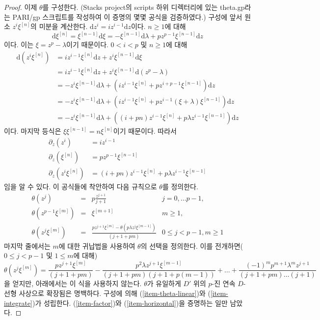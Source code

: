 \begin{proof}
\medskip\noindent
이제 $\theta$를 구성한다. (Stacks project의 scripts 하위 디렉터리에
있는 theta.gp라는 PARI/gp 스크립트를 작성하여 이 증명의 몇몇 공식을
검증하였다.) 구성에 앞서 원소 $z^i \xi^{[n]}$의 미분을 계산한다.
$\text{d}z^i = i z^{i - 1} \text{d}z$이다. $n \geq 1$에 대해
$$
\text{d}\xi^{[n]} =
\xi^{[n - 1]} \text{d}\xi =
- \xi^{[n - 1]}\text{d}\lambda + p z^{p - 1} \xi^{[n - 1]}\text{d}z
$$
이다. 이는 $\xi = z^p - \lambda$이기 때문이다. $0 < i < p$ 및
$n \geq 1$에 대해
\begin{align*}
\text{d}(z^i\xi^{[n]})
& =
iz^{i - 1}\xi^{[n]}\text{d}z + z^i\xi^{[n - 1]}\text{d}\xi \\
& =
iz^{i - 1}\xi^{[n]}\text{d}z + z^i\xi^{[n - 1]}\text{d}(z^p - \lambda) \\
& =
- z^i\xi^{[n - 1]}\text{d}\lambda +
(iz^{i - 1}\xi^{[n]} + pz^{i + p - 1}\xi^{[n - 1]})\text{d}z \\
& =
- z^i\xi^{[n - 1]}\text{d}\lambda +
(iz^{i - 1}\xi^{[n]} + pz^{i - 1}(\xi + \lambda)\xi^{[n - 1]})\text{d}z \\
& =
- z^i\xi^{[n - 1]}\text{d}\lambda +
((i + pn)z^{i - 1}\xi^{[n]} + p\lambda z^{i - 1}\xi^{[n - 1]})\text{d}z
\end{align*}
이다. 마지막 등식은 $\xi \xi^{[n - 1]} = n\xi^{[n]}$이기 때문이다.
따라서
\begin{align*}
\partial_z(z^i) & = i z^{i - 1} \\
\partial_z(\xi^{[n]}) & = p z^{p - 1} \xi^{[n - 1]} \\
\partial_z(z^i\xi^{[n]}) & =
(i + pn) z^{i - 1} \xi^{[n]} + p \lambda z^{i - 1}\xi^{[n - 1]}
\end{align*}
임을 알 수 있다. 이 공식들에 착안하여 다음 규칙으로 $\theta$를 정의한다.
$$
\begin{matrix}
\theta(z^j)
& = & p\frac{z^{j + 1}}{j + 1}
& j = 0, \ldots p - 1, \\
\theta(z^{p - 1}\xi^{[m]})
& = & \xi^{[m + 1]}
& m \geq 1, \\
\theta(z^j \xi^{[m]})
& = &
\frac{p z^{j + 1} \xi^{[m]} - \theta(p\lambda z^j \xi^{[m - 1]})}{(j + 1 + pm)}
& 0 \leq j < p - 1, m \geq 1
\end{matrix}
$$
마지막 줄에서는 $m$에 대한 귀납법을 사용하여 $\theta$의 선택을
정의한다. 이를 전개하면($0 \leq j < p - 1$ 및 $1 \leq m$에 대해)
$$
\theta(z^j \xi^{[m]}) =
\textstyle{\frac{p z^{j + 1} \xi^{[m]}}{(j + 1 + pm)} -
\frac{p^2 \lambda z^{j + 1} \xi^{[m - 1]}}{(j + 1 + pm)(j + 1 + p(m - 1))} +
\ldots +
\frac{(-1)^m p^{m + 1} \lambda^m z^{j + 1}}
{(j + 1 + pm) \ldots (j + 1)}}
$$
을 얻지만, 아래에서는 이 식을 사용하지 않는다. $\theta$가 유일하게
$D'$ 위의 $p$-진 연속 $D$-선형 사상으로 확장됨은 명백하다. 구성에
의해 (\ref{item-theta-linear})와 (\ref{item-integrate})가 성립한다.
(\ref{item-factor})와 (\ref{item-horizontal})을 증명하는 일만 남았다.


\end{proof}
